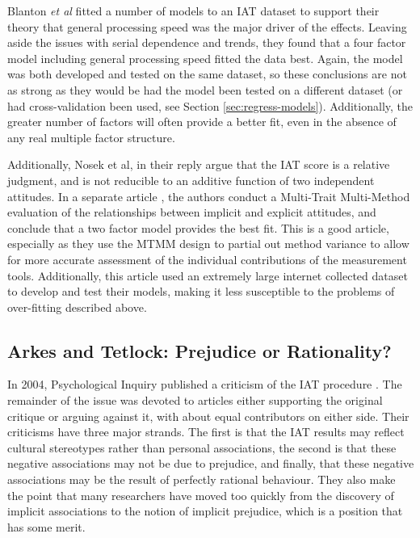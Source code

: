 Blanton \textit{et al} \cite{Blanton2006} fitted a number of models to an IAT dataset to support their theory that general processing speed was the major driver of the effects. Leaving aside the issues with serial dependence and trends, they found that a four factor model including general processing speed fitted the data best. Again, the model was both developed and tested on the same dataset, so these conclusions are not as strong as they would be had the model been tested on a different dataset (or had cross-validation been used, see Section \ref{sec:regress-models}). Additionally, the greater number of factors will often provide a better fit, even in the absence of any real multiple factor structure. 

Additionally, Nosek et al, in their reply argue that the IAT score is a relative judgment, and is not reducible to an additive function of two independent attitudes. In a separate article \cite{Nosek2007a}, the authors conduct a Multi-Trait Multi-Method evaluation of the relationships between implicit and explicit attitudes, and conclude that a two factor model provides the best fit. This is a good article, especially as they use the MTMM design to partial out method variance to allow for more accurate assessment of the individual contributions of the measurement tools. Additionally, this article used an extremely large internet collected dataset to develop and test their models, making it less susceptible to the problems of over-fitting described above. 

\subsection{Arkes and Tetlock: Prejudice or Rationality?}
\label{sec:arkes-tetl-prej}

In 2004, Psychological Inquiry published a criticism of the IAT procedure \cite{Arkes2004}. The remainder of the issue was devoted to articles either supporting the original critique or arguing against it, with about equal contributors on either side. Their criticisms have three major strands. The first is that the IAT results may reflect cultural stereotypes rather than personal associations, the second is that these negative associations may not be due to prejudice, and finally, that these negative associations may be the result of perfectly rational behaviour. They also make the point that many researchers have moved too quickly from the discovery of implicit associations to the notion of implicit prejudice, which is a position that has some merit. 

